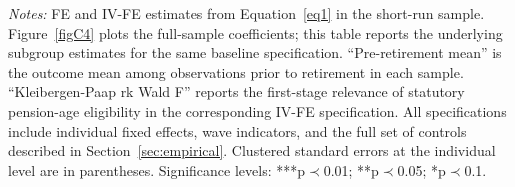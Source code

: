 \documentclass[arguments, manuscript, 11pt]{aastex631}
\begin{document}
\begin{table}[h]
\tiny{{\singlespacing \emph{Notes:} FE and IV-FE estimates from Equation~\ref{eq1} in the short-run sample. Figure~\ref{figC4} plots the full-sample coefficients; this table reports the underlying subgroup estimates for the same baseline specification. ``Pre-retirement mean'' is the outcome mean among observations prior to retirement in each sample. ``Kleibergen-Paap rk Wald F'' reports the first-stage relevance of statutory pension-age eligibility in the corresponding IV-FE specification. All specifications include individual fixed effects, wave indicators, and the full set of controls described in Section~\ref{sec:empirical}. Clustered standard errors at the individual level are in parentheses. Significance levels: ***p$\prec$0.01; **p$\prec$0.05; *p$\prec$0.1.}}
\end{table}
\end{document}
